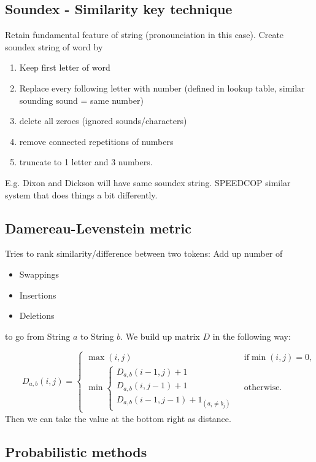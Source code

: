 \documentclass[11pt]{article}
\begin{document}
\subsection{Soundex - Similarity key technique}
Retain fundamental feature of string (pronounciation in this case). Create soundex string of word by
\begin{enumerate}
	\item Keep first letter of word
	\item Replace every following letter with number (defined in lookup table, similar sounding sound = same number)
	\item delete all zeroes (ignored sounds/characters)
	\item remove connected repetitions of numbers
	\item truncate to 1 letter and 3 numbers.
\end{enumerate}
E.g. Dixon and Dickson will have same soundex string. SPEEDCOP similar system that does things a bit
differently. 
\subsection{Damereau-Levenstein metric}
\label{sub:levenstein}
Tries to rank similarity/difference between two tokens: Add up number of
\begin{itemize}
	\item Swappings
	\item Insertions
	\item Deletions
\end{itemize}
to go from String $a$ to String $b$. We build up matrix $D$ in the following way:

\begin{equation}
	\qquad D_{a,b}(i,j) = \begin{cases}
  \max(i,j) & \text{ if} \min(i,j)=0, \\
  \min \begin{cases}
          D_{a,b}(i-1,j) + 1 \\
          D_{a,b}(i,j-1) + 1 \\
          D_{a,b}(i-1,j-1) + 1_{(a_i \neq b_j)}
       \end{cases} & \text{ otherwise.}
\end{cases}
\end{equation}
Then we can take the value at the bottom right as distance.

\subsection{Probabilistic methods}
\label{sub:probabilistic_methods}
\end{document}
